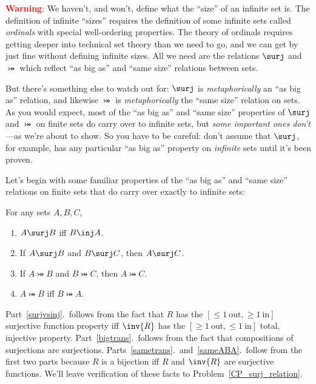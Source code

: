 \textbf{\textcolor{red}{Warning}}: We haven't, and won't, define what
the ``size'' of an infinite set is.  The definition of infinite
``sizes'' requires the definition of some infinite sets called
\emph{ordinals} with special well-ordering properties.  The theory of
ordinals requires getting deeper into technical set theory than we
need to go, and we can get by just fine without defining infinite
sizes.  All we need are the relations $\surj$ and $\bij$ which reflect
``as big as'' and ``same size'' relations between sets.

But there's something else to watch out for: $\surj$ is
\emph{metaphorically} an ``as big as'' relation, and likewise $\bij$
is \emph{metaphorically} the ``same size'' relation on sets.  As you
would expect, most of the ``as big as'' and ``same size'' properties
of $\surj$ and $\bij$ on finite sets do carry over to infinite sets,
but \emph{some important ones don't}---as we're about to show.  So you
have to be careful: don't assume that $\surj$, for example, has any
particular ``as big as'' property on \emph{infinite} sets until it's
been proven.

Let's begin with some familiar properties of the ``as big as'' and
``same size'' relations on finite sets that do carry over exactly to
infinite sets:
\begin{lemma}\label{surjinjbij_properties}
For any sets $A,B,C$,
\begin{enumerate}

\item \label{surjvsinj} $A \surj B$ iff $B \inj A$.

\item \label{bigtrans} If $A \surj B$ and $B \surj C$, then $A \surj
  C$.

\item \label{sametrans} If $A \bij B$ and $B \bij C$, then $A \bij C$.

\item\label{sameABA} $A \bij B$ iff $B \bij A$.
\end{enumerate}
\end{lemma}

Part~\ref{surjvsinj}.\ follows from the fact that $R$ has the $[\le
  1\ \text{out}, \ge 1\ \text{in}]$ surjective function property iff
$\inv{R}$ has the $[\ge 1\ \text{out}, \le 1\ \text{in}]$ total,
injective property.  Part~\ref{bigtrans}.\ follows from the fact that
compositions of surjections are surjections.
Parts~\ref{sametrans}.\ and~\ref{sameABA}.\ follow from the first two
parts because $R$ is a bijection iff $R$ and $\inv{R}$ are surjective
functions.  We'll leave verification of these facts to
Problem~\ref{CP_surj_relation}.

